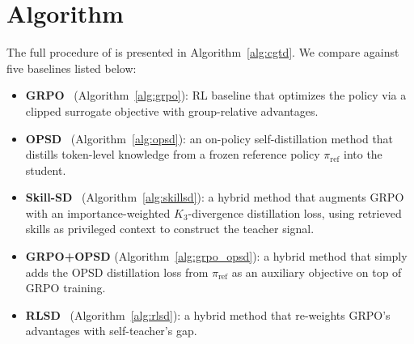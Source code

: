 \section{Algorithm}
\label{appendix:algorithm}
The full procedure of \methodname{} is presented in Algorithm~\ref{alg:cgtd}.
We compare against five baselines listed below:
\begin{itemize}
  \item \textbf{GRPO}~\citep{shao2024deepseekmath} (Algorithm~\ref{alg:grpo}): RL baseline that optimizes the policy via a clipped surrogate objective with group-relative advantages.
  \item \textbf{OPSD}~\citep{zhao2026opsd} (Algorithm~\ref{alg:opsd}): an on-policy self-distillation method that distills token-level knowledge from a frozen reference policy $\pi_{\mathrm{ref}}$ into the student.
  \item \textbf{Skill-SD}~\citep{wang2026skillsd} (Algorithm~\ref{alg:skillsd}): a hybrid method that augments GRPO with an importance-weighted $K_3$-divergence distillation loss, using retrieved skills as privileged context to construct the teacher signal.
  \item \textbf{GRPO+OPSD} (Algorithm~\ref{alg:grpo_opsd}): a hybrid method that simply adds the OPSD distillation loss from $\pi_{\mathrm{ref}}$ as an auxiliary objective on top of GRPO training.
  \item \textbf{RLSD}~\citep{yang2026rlsd} (Algorithm~\ref{alg:rlsd}): a hybrid method that re-weights GRPO's advantages with self-teacher's gap.
\end{itemize}

